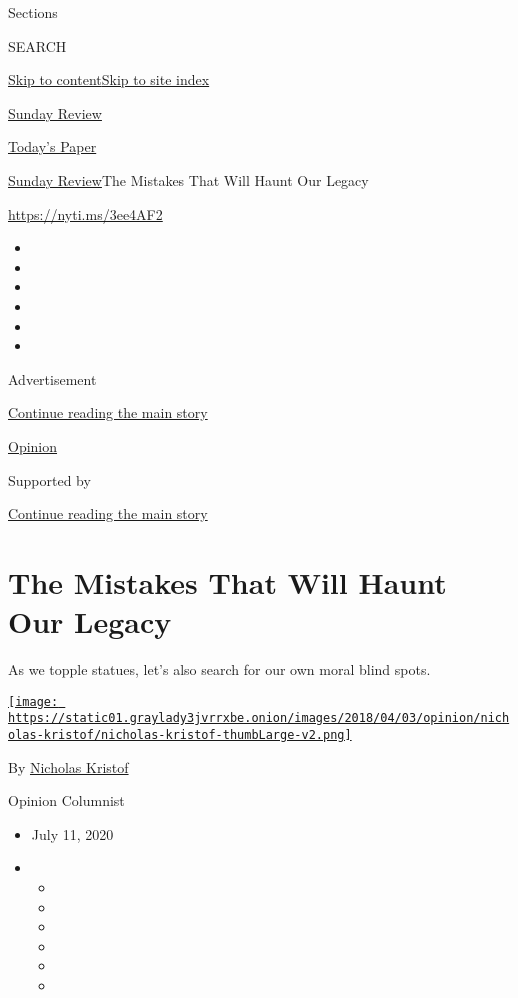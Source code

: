 Sections

SEARCH

\protect\hyperlink{site-content}{Skip to
content}\protect\hyperlink{site-index}{Skip to site index}

\href{https://www.nytimes3xbfgragh.onion/section/opinion/sunday}{Sunday
Review}

\href{https://myaccount.nytimes3xbfgragh.onion/auth/login?response_type=cookie\&client_id=vi}{}

\href{https://www.nytimes3xbfgragh.onion/section/todayspaper}{Today's
Paper}

\href{/section/opinion/sunday}{Sunday Review}\textbar{}The Mistakes That
Will Haunt Our Legacy

\url{https://nyti.ms/3ee4AF2}

\begin{itemize}
\item
\item
\item
\item
\item
\item
\end{itemize}

Advertisement

\protect\hyperlink{after-top}{Continue reading the main story}

\href{/section/opinion}{Opinion}

Supported by

\protect\hyperlink{after-sponsor}{Continue reading the main story}

\hypertarget{the-mistakes-that-will-haunt-our-legacy}{%
\section{The Mistakes That Will Haunt Our
Legacy}\label{the-mistakes-that-will-haunt-our-legacy}}

As we topple statues, let's also search for our own moral blind spots.

\href{https://www.nytimes3xbfgragh.onion/column/nicholas-kristof}{\texttt{[image: https://static01.graylady3jvrrxbe.onion/images/2018/04/03/opinion/nicholas-kristof/nicholas-kristof-thumbLarge-v2.png]}}

By
\href{https://www.nytimes3xbfgragh.onion/column/nicholas-kristof}{Nicholas
Kristof}

Opinion Columnist

\begin{itemize}
\item
  July 11, 2020
\item
  \begin{itemize}
  \item
  \item
  \item
  \item
  \item
  \item
  \end{itemize}
\end{itemize}

